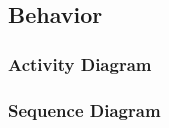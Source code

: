 \subsection{Behavior} \label{requirementspecification:Behavior}

\subsubsection{Activity Diagram}

\subsubsection{Sequence Diagram}